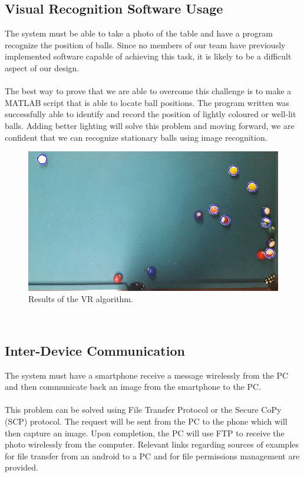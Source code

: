 \documentclass[titlepage]{article}
\begin{document}
\subsection{Visual Recognition Software Usage}
The system must be able to take a photo of the table and have a program recognize the position of balls. Since no members of our team have previously implemented software capable of achieving this task, it is likely to be a difficult aspect of our design.\\\\
The best way to prove that we are able to overcome this challenge is to make a MATLAB script that is able to locate ball positions. The program written was successfully able to identify and record the position of lightly coloured or well-lit balls. Adding better lighting will solve this problem and moving forward, we are confident that we can recognize stationary balls using image recognition.
\newpage
\begin{figure}
\centering
	\includegraphics{ballsOnTable.png}
\caption{Results of the VR algorithm.}
\end{figure}~\\

\subsection{Inter-Device Communication}
The system must have a smartphone receive a message wirelessly from the PC and then communicate back an image from the smartphone to the PC.\\\\

This problem can be solved using File Transfer Protocol or the Secure CoPy (SCP) protocol. The request will be sent from the PC to the phone which will then capture an image. Upon completion, the PC will use FTP to receive the photo wirelessly from the computer. Relevant links regarding sources of examples for file transfer from an android to a PC and for file permissions management are provided.\\ 
\end{document}
